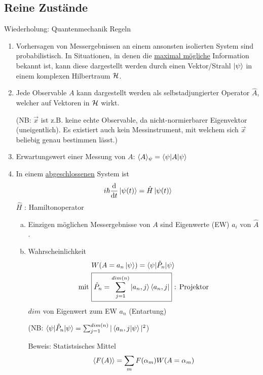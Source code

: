 \subsection{Reine Zustände} 
Wiederholung: Quantenmechanik Regeln
	\begin{enumerate}[1.]
		\item Vorhersagen von Messergebnissen an einem ansonsten isolierten System sind probabilistisch. In Situationen, in denen die \underline{maximal mögliche} Information bekannt ist, kann diese dargestellt werden durch einen Vektor/Strahl $\ket{\psi}$ in einem komplexen Hilbertraum $\mathcal{H}$.
		\item Jede Observable $A$ kann dargestellt werden als selbstadjungierter Operator $\hat{A}$, welcher auf Vektoren in $\mathcal{H}$ wirkt.
		
		(NB: $\vec{x}$ ist z.B. keine echte Observable, da nicht-normierbarer Eigenvektor (uneigentlich). Es existiert auch kein Messinstrument, mit welchem sich $\vec{x}$ beliebig genau bestimmen lässt.)
		\item Erwartungswert einer Messung von $A$: $\langle {A} \rangle_\psi = \braket{\psi | A | \psi}$
		\item In einem \underline{abgeschlossenen} System ist
			\begin{align*}
				i \hbar \frac{\mathrm{d}}{\mathrm{d} t} \ket{\psi (t)} = \hat{H} \ket{\psi(t)}
			\end{align*}
		$\hat{H}$ : Hamiltonoperator
		\begin{enumerate}[(a)]
			\item Einzigen möglichen Messergebnisse von $A$ sind Eigenwerte (EW) $a_i$ von $\hat{A}$.
			\item Wahrscheinlichkeit
				\begin{align*}
					&W(A = a_n \ket{\psi}) = \braket{\psi | \hat{P}_n | \psi} \\
					\text{mit}~
					&\boxed{\hat{P}_n = \sum_{j = 1}^{dim (n)} \ket{a_n, j} \bra{a_n, j}}
					~\text{: Projektor}
				\end{align*}
			$dim$ von Eigenwert zum EW $a_n$ (Entartung)
			
			(NB: $\braket{\psi | \hat{P}_n | \psi} = \sum_{j= 1}^{dim(n)}|\braket{a_n, j | \psi}|^2$)
			
			Beweis: Statistsisches Mittel
				\begin{align*}
					\langle {F(A)} \rangle = \sum_m F(\alpha_m) W(A = \alpha_m)
				\end{align*}
				

\end{enumerate}
\end{enumerate}
